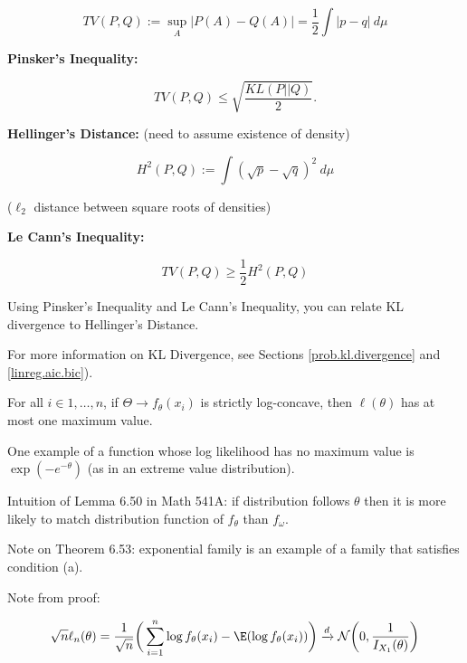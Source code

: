 \begin{remark}
\begin{enumerate}
\[
TV(P, Q) := \sup_{A} | P(A) - Q(A)| = \frac{1}{2} \int |p - q| \ d \mu
\]

\textbf{Pinsker's Inequality:}

\[
TV(P, Q) \leq \sqrt{ \frac{KL (P || Q)}{2}}.
\]

\textbf{Hellinger's Distance:} (need to assume existence of density)

\[
H^2(P,Q) :=  \int ( \sqrt{p} - \sqrt{q} )^2 \ d \mu
\]

(\(\ell_2\) distance between square roots of densities)

\textbf{Le Cann's Inequality:}

\[
TV(P, Q) \geq \frac{1}{2} H^2(P, Q)
\]

Using Pinsker's Inequality and Le Cann's Inequality, you can relate KL divergence to Hellinger's Distance.

\end{enumerate}

For more information on KL Divergence, see Sections \ref{prob.kl.divergence} and \ref{linreg.aic.bic}).

\end{remark}

\begin{proposition} For all \(i \in 1, \ldots, n\), if \(\Theta \to f_\theta(x_i)\) is strictly log-concave, then \(\ell(\theta)\) has at most one maximum value.

\end{proposition}

\begin{remark}One example of a function whose log likelihood has no maximum value is \(\exp(-e^{-\theta})\) (as in an extreme value distribution). 

\end{remark}

\begin{remark} Intuition of Lemma 6.50 in Math 541A: if distribution follows \(\theta\) then it is more likely to match distribution function of \(f_\theta\) than \(f_\omega\).

\end{remark}

Note on Theorem 6.53: exponential family is an example of a family that satisfies condition (a).

Note from proof:

\[
\sqrt{n}\ell_n(\theta) = \frac{1}{\sqrt{n}} \bigg( \sum_{i=1}^n \log f_\theta(x_i) -  \E( \log f_\theta(x_i) ) \bigg) \xrightarrow{d} \mathcal{N} \bigg (0, \frac{1}{I_{X_1}(\theta)} \bigg)
\]

